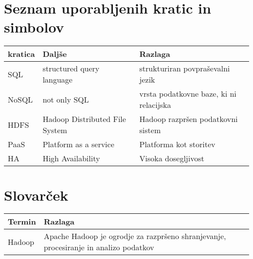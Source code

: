 \section*{Seznam uporabljenih kratic in simbolov}

\noindent\begin{tabular}{p{} p{} p{}}
  {\bf kratica} & {\bf Daljše} & {\bf Razlaga} \\ \hline
  SQL & structured query language & strukturiran povpraševalni jezik \\
  NoSQL & not only SQL &  vrsta podatkovne baze, ki ni relacijska \\
  HDFS & Hadoop Distributed File System & Hadoop razpršen podatkovni sistem \\
  PaaS & Platform as a service & Platforma kot storitev \\
  HA & High Availability & Visoka dosegljivost \\
\end{tabular}

\section*{Slovarček}
\noindent\begin{tabular}{p{} p{}}
  {\bf Termin} & {\bf Razlaga} \\ \hline
  Hadoop & Apache Hadoop je ogrodje za razpršeno 
  shranjevanje, procesiranje in analizo podatkov~\cite{tech_hadoop} \\
\end{tabular}
